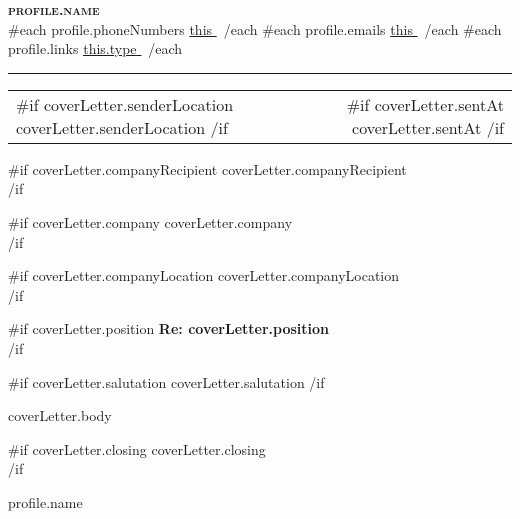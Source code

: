 \documentclass[letterpaper,11pt]{article}
\begin{document}
\begin{center}
  \textbf{\Huge\scshape {{profile.name}} } \\ \vspace{1pt}
  {{#each profile.phoneNumbers}} \small{\underline{ {{this}} }}\, {{/each}}
  {{#each profile.emails}} \small{\underline{ {{this}} }}\, {{/each}}
  {{#each profile.links}} \small{\href{ {{this.url}} }{\underline{ {{this.type}} }}}\, {{/each}}
\end{center}

\vspace{10pt}
\rule{\textwidth}{0.4pt}
\vspace{10pt}

\begin{tabularx}{\textwidth}{Xr}
  {{#if coverLetter.senderLocation}}
    {{coverLetter.senderLocation}}
  {{/if}}
  &
  {{#if coverLetter.sentAt}}
    {{coverLetter.sentAt}}
  {{/if}} \\
\end{tabularx}

\vspace{30pt}

{{#if coverLetter.companyRecipient}}
  {{coverLetter.companyRecipient}}\\
{{/if}}

{{#if coverLetter.company}}
  {{coverLetter.company}}\\
{{/if}}

{{#if coverLetter.companyLocation}}
  {{coverLetter.companyLocation}}\\
{{/if}}

\vspace{20pt}
{{#if coverLetter.position}}
  \textbf{Re: {{coverLetter.position}} }\\
{{/if}}

\vspace{20pt}
{{#if coverLetter.salutation}}
  {{coverLetter.salutation}}
{{/if}}

\vspace{12pt}
{{{coverLetter.body}}}

\vspace{20pt}
{{#if coverLetter.closing}}
  {{coverLetter.closing}}\\
{{/if}}

\vspace{12pt}
{{profile.name}}\\
\end{document}
